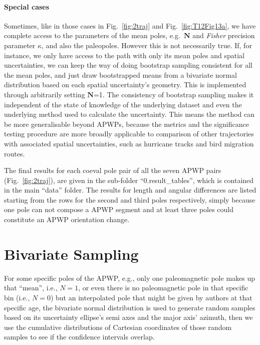 \paragraph{Special cases} Sometimes, like in those cases in Fig.~\ref{fig:2traj}
and Fig.~\ref{fig:T12Fig13a}, we have complete access to the parameters of the
mean poles, e.g.\ $\mathbf{N}$ and \emph{Fisher} precision parameter $\kappa$, and also
the paleopoles. However this is not necessarily true. If, for instance, we only
have access to the path with only its mean poles and spatial uncertainties, we
can keep the way of doing bootstrap sampling consistent for all the mean poles,
and just draw bootstrapped means from a bivariate normal distribution based on
each spatial uncertainty's geometry. This is implemented through arbitrarily
setting $\mathbf{N}$=1. The consistency of bootstrap sampling makes it
independent of the state of knowledge of the underlying dataset and even the
underlying method used to calculate the uncertainty. This means the method can
be more generalisable beyond APWPs, because the metrics and the significance
testing procedure are more broadly applicable to comparison of other
trajectories with associated spatial uncertainties, such as hurricane tracks and
bird migration routes.

The final results for each coeval pole pair of all the seven APWP pairs
(Fig.~\ref{fig:2traj}), are given in the sub-folder ``0.result\_tables'', which
is contained in the main ``data'' folder. The results for length and angular
differences are listed starting from the rows for the second and third poles
respectively, simply because one pole can not compose a APWP segment and at
least three poles could constitute an APWP orientation change.

\section{Bivariate Sampling}\label{sec:biv}
For some specific poles of the APWP, e.g., only one paleomagnetic pole makes up
that ``mean'', i.e., $N=1$, or even there is no paleomagnetic pole in that
specific bin (i.e., $N=0$) but an interpolated pole that might be given by
authors at that specific age, the bivariate normal distribution is used to
generate random samples based on its uncertainty ellipse's semi axes and the
major axis' azimuth, then we use the cumulative distributions of Cartesian
coordinates of those random samples to see if the confidence intervals overlap.


